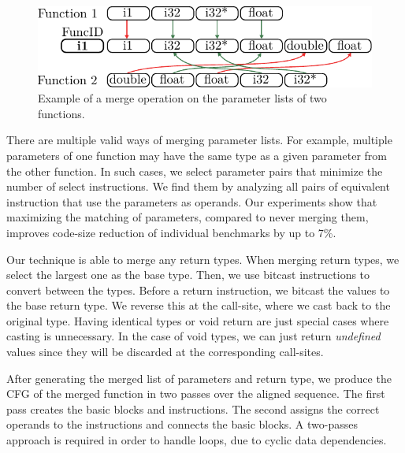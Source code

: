 \begin{figure}[t!]
  \centering
  \includegraphics[width=0.9\linewidth]{figs/merged-params.pdf}
  \caption{Example of a merge operation on the parameter lists of two functions.}
  \label{fig:merged-params}
\end{figure}

There are multiple valid ways of merging parameter lists. For example, multiple
parameters of one function may have the same type as a given parameter from the other
function. In such cases, we select parameter pairs that minimize the number of
select instructions. We find them by analyzing all pairs of equivalent instruction
that use the parameters as operands. 
Our experiments show that maximizing the matching of parameters, compared to never
merging them, improves code-size reduction of individual benchmarks by up to 7\%.


Our technique is able to merge any return types.
When merging return types, we select the largest one as the base type.
Then, we use bitcast instructions to convert between the types.
Before a return instruction, we bitcast the values to the base return type.
We reverse this at the call-site, where we cast back to the original type.
Having identical types or void return are just special cases where casting is
unnecessary.
In the case of void types, we can just return \textit{undefined} values since they
will be discarded at the corresponding call-sites.

After generating the merged list of parameters and return type, we produce the
CFG of the merged function in two passes over the aligned sequence.
The first pass creates the basic blocks and instructions.
The second assigns the correct operands to the instructions and connects the basic blocks.
A two-passes approach is required in order to handle loops, due to cyclic data dependencies.


